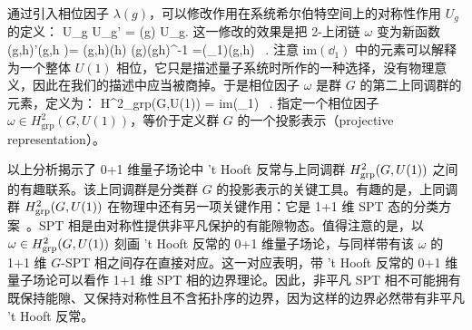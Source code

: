 通过引入相位因子 $\lambda(g)$，可以修改作用在系统希尔伯特空间上的对称性作用 $U_g$ 的定义：
\be
U_g \mapsto U_g' = \lambda(g) U_g.
\ee
这一修改的效果是把 2-上闭链 $\omega$ 变为新函数
\be
\omega(g,h)\mapsto \omega'(g,h )= \omega(g,h)\lambda(h)   \lambda(g)\lambda(gh)^{-1} =(\omega\cdot \dd_1\lambda)(g,h) \ . 
\ee
注意 ${\text{im}(\dd_1)}$ 中的元素可以解释为一个整体 $U(1)$ 相位，它只是描述量子系统时所作的一种选择，没有物理意义，因此在我们的描述中应当被商掉。于是相位因子 $\omega$ 是群 $G$ 的第二上同调群的元素，定义为：
\be H^2_{\rm grp}(G,U(1))  =   {{\rm im}(\dd_1)} \ . \ee
指定一个相位因子 $\omega \in H^2_{\text{grp}}(G, U(1))$，等价于定义群 $G$ 的一个投影表示（projective representation）。

以上分析揭示了 0+1 维量子场论中 't Hooft 反常与上同调群 $H^2_{\rm grp}(G,U(1))$ 之间的有趣联系。该上同调群是分类群 $G$ 的投影表示的关键工具。有趣的是，上同调群 $H^2_{\rm grp}(G,U(1))$ 在物理中还有另一项关键作用：它是 1+1 维 SPT 态的分类方案~\cite{SPT1D1,SPT1D2,SPT1D3,SPT1D4}。SPT 相是由对称性提供非平凡保护的有能隙物态。值得注意的是，以 $\omega \in H^2_{\rm grp}(G,U(1))$ 刻画 't Hooft 反常的 0+1 维量子场论，与同样带有该 $\omega$ 的 1+1 维 $G$-SPT 相之间存在直接对应。这一对应表明，带 't Hooft 反常的 0+1 维量子场论可以看作 1+1 维 SPT 相的边界理论。因此，非平凡 SPT 相不可能拥有既保持能隙、又保持对称性且不含拓扑序的边界，因为这样的边界必然带有非平凡 't Hooft 反常。

\begin{center}
\end{center}

